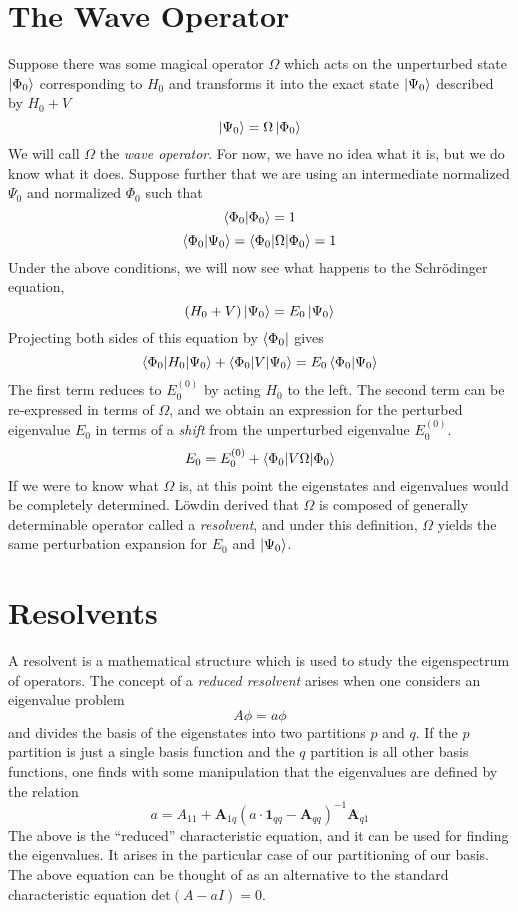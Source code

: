\documentclass{article}
\newcommand{\Ezero}{E^{(0)}}
\begin{document}
\section{The Wave Operator}
Suppose there was some magical operator $\Omega$ which
acts on the unperturbed state $\ket{\Phi_0}$ corresponding to $H_0$ 
and transforms it into the exact state $\ket{\Psi_0}$ described by $H_0 + V$
\[\ket{\Psi_0} = \Omega \ket{\Phi_0} \]
We will call $\Omega$ the \textit{wave operator}.
For now, we have no idea what it is, but we do know what it does.
Suppose further that we are using an intermediate normalized $\Psi_0$ and normalized $\Phi_0$ such that
\[ \braket{\Phi_0|\Phi_0} = 1 \]
\[ \braket{\Phi_0 | \Psi_0} = \braket{\Phi_0 | \Omega | \Phi_0} = 1 \]
Under the above conditions, we will now see what happens to the Schr{\"o}dinger equation,
\[(H_0 + V) \ket{\Psi_0} = E_0 \ket{\Psi_0} \]
Projecting both sides of this equation by $\bra{\Phi_0}$ gives
\[\braket{\Phi_0 | H_0 | \Psi_0} + \braket{\Phi_0 | V | \Psi_0} = E_0 \braket{\Phi_0|\Psi_0} \]
The first term reduces to $\Ezero_0$ by acting $H_0$ to the left. The second term 
can be re-expressed in terms of $\Omega$, and we obtain an expression for the 
perturbed eigenvalue $E_0$ in terms of a \textit{shift} from the unperturbed eigenvalue $\Ezero_0$.  
\[ E_0 = \Ezero_0 + \braket{\Phi_0 | V \Omega | \Phi_0}  \]
If we were to know what $\Omega$ is, at this point the eigenstates and eigenvalues would be completely
determined.
L{\"o}wdin derived that $\Omega$ is composed of generally determinable operator called a \textit{resolvent},
and under this definition, $\Omega$ yields the same perturbation expansion for $E_0$ and $\ket{\Psi_0}$.

\section{Resolvents}
A resolvent is a mathematical structure which is used to study the eigenspectrum
of operators.
The concept of a \textit{reduced resolvent} arises when one considers an eigenvalue problem \[A \phi = a \phi \]
and divides the basis of the eigenstates into two partitions $p$ and $q$. 
If the $p$ partition is just a single basis function and the $q$ partition 
    is all other basis functions,
    one finds with some manipulation that the eigenvalues are defined by the relation 
\[ a =  A_{11} + \mathbf{A}_{1q}( a \cdot \mathbf{1}_{qq} - \mathbf{A}_{qq})^{-1} \mathbf{A}_{q1} \]
The above is the ``reduced'' characteristic equation, and it can be used for finding the eigenvalues.
It arises in the particular case of our partitioning of our basis.
The above equation can be thought of as an alternative to the standard characteristic equation $\mathrm{det}(A - aI) = 0$.
\end{document}
